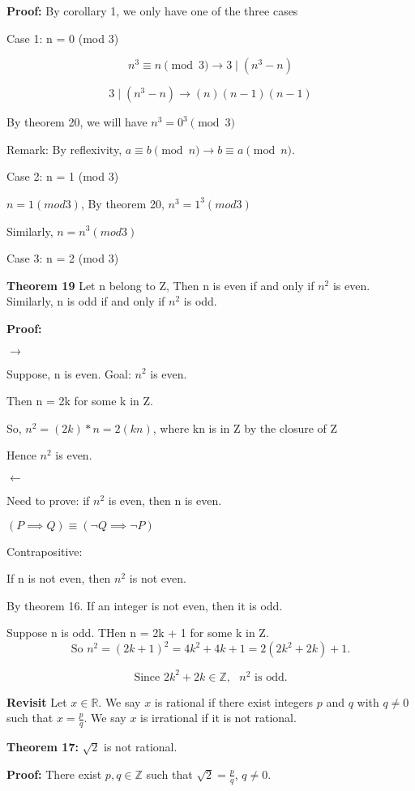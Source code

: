 \documentclass[12 pt]{article}        	%
\begin{document}
\textbf{Proof:}
By corollary 1, we only have one of the three cases

Case 1: n = 0 (mod 3)

\[
 	n^3 \equiv n \pmod{3} \longrightarrow  3 \mid (n^3 - n)
\]

\[
	3 \mid (n^3 - n) \longrightarrow (n)(n - 1)(n - 1)
\]

By theorem 20, we will have $n^3 = 0^3 \pmod{3}$


Remark: By reflexivity, $a \equiv b \!\pmod{n} \longrightarrow b \equiv a \pmod{n}$.

Case 2: n = 1 (mod 3)

$n = 1 (mod 3)$, By theorem 20, $n^3 = 1^3 (mod 3)$

Similarly, $n = n^3(mod 3)$

Case 3: n = 2 (mod 3)

\textbf{Theorem 19}	
Let n belong to Z, Then n is even if and only if $n^2$ is even. Similarly, n is odd if and only if $n^2$ is odd.

\textbf{Proof:}

$\longrightarrow$

Suppose, n is even. Goal: $n^2$ is even.

Then n = 2k for some k in Z.

So, $n^2 = (2k) * n = 2(kn)$, where kn is in Z by the closure of Z

Hence $n^2$ is even.

$\longleftarrow$

Need to prove: if $n^2$ is even, then n is even.

$(P \implies Q) \equiv (\lnot Q \implies \lnot P)$

Contrapositive: 

If n is not even, then $n^2$ is not even.

By theorem 16. If an integer is not even, then it is odd.

Suppose n is odd. THen n = 2k + 1 for some k in Z.
\[
\text{So } n^2 = (2k + 1)^2 = 4k^2 + 4k + 1 = 2(2k^2 + 2k) + 1.
\]

\[
\text{Since } 2k^2 + 2k \in \mathbb{Z}, \text{ } n^2 \text{ is odd.}
\]

\textbf{Revisit}
Let $x \in \mathbb{R}$. We say $x$ is rational if there exist integers $p$ and $q$ with $q \neq 0$ such that $x = \frac{p}{q}$. We say $x$ is irrational if it is not rational.

\textbf{Theorem 17:}
$\sqrt{2}$ is not rational.

\textbf{Proof:}
There exist $p, q \in \mathbb{Z}$ such that $\sqrt{2} = \frac{p}{q}$, $q \neq 0$.
\end{document}
